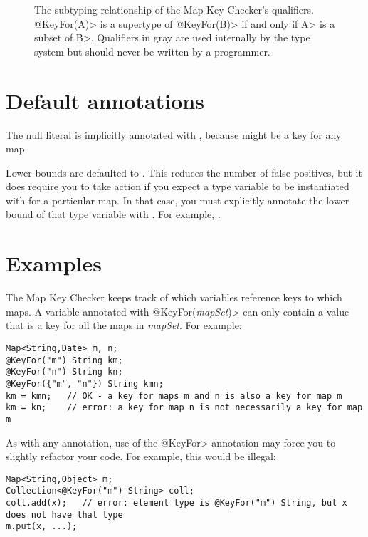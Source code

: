 \begin{figure}
\caption{The subtyping relationship of the Map Key Checker's qualifiers.
\<@KeyFor(A)> is a supertype of \<@KeyFor(B)> if and only if \<A> is a subset of
\<B>.  Qualifiers in gray are used internally by the type system but should
never be written by a programmer.}
\label{fig-map-key-keyfor-hierarchy}
\end{figure}

\section{Default annotations\label{map-key-defaults}}

The null literal is implicitly annotated with , because
 might be a key for any map.

Lower bounds are defaulted to .
This reduces the number of false
positives, but it does require you to take action if you expect a
type variable to be instantiated with  for a particular map.
In that case,
you must explicitly annotate the lower bound of that type variable with
.  For example, .

\section{Examples\label{map-key-examples}}

The Map Key Checker keeps track of which variables reference keys to
which maps.  A variable annotated with \<@KeyFor(\emph{mapSet})> can only
contain a value that is a key for all the maps in \emph{mapSet}.  For example:

\begin{verbatim}
Map<String,Date> m, n;
@KeyFor("m") String km;
@KeyFor("n") String kn;
@KeyFor({"m", "n"}) String kmn;
km = kmn;   // OK - a key for maps m and n is also a key for map m
km = kn;    // error: a key for map n is not necessarily a key for map m
\end{verbatim}


As with any annotation, use of the \<@KeyFor> annotation may force you to
slightly refactor your code.  For example, this would be illegal:

\begin{verbatim}
Map<String,Object> m;
Collection<@KeyFor("m") String> coll;
coll.add(x);   // error: element type is @KeyFor("m") String, but x does not have that type
m.put(x, ...);
\end{verbatim}

